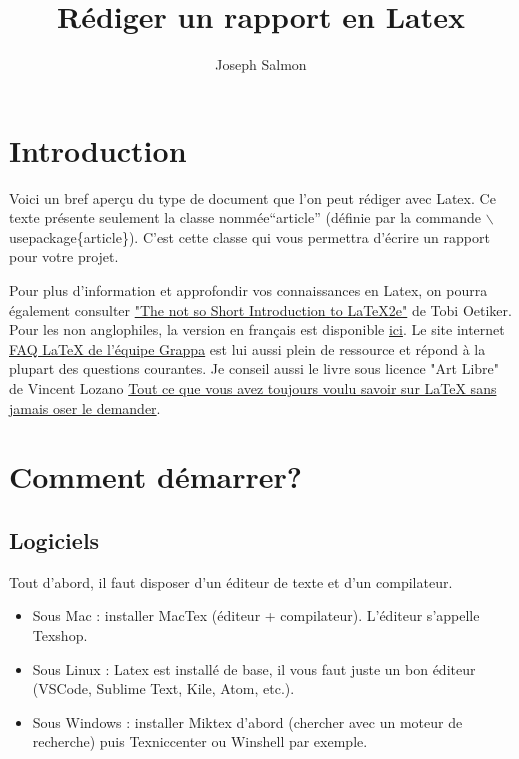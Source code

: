 \documentclass[11pt]{article}
\title{Rédiger un rapport en Latex}
\author{Joseph Salmon}
\date {}
\theoremstyle{remark}
\theoremstyle{definition}
\begin{document}
\sloppy
\maketitle
\tableofcontents
\section{Introduction}

Voici un bref aperçu du type de document que l'on peut rédiger avec  Latex.
Ce texte  présente seulement la classe nommée``article'' (définie par la commande $\backslash$usepackage\{article\}). C'est cette classe  qui vous permettra d'écrire un rapport pour votre projet.


Pour plus d'information et approfondir vos connaissances en Latex, on pourra également consulter   \href{http://tobi.oetiker.ch/lshort/}{"The not so Short Introduction to LaTeX2e"} de Tobi Oetiker. Pour les non anglophiles, la version  en français est disponible  \href{http://www.laas.fr/~matthieu/cours/latex2e/}{ici}. Le site internet \href{http://www.grappa.univ-lille3.fr/FAQ-LaTeX/}{FAQ LaTeX de l'équipe Grappa} est lui aussi plein de ressource et répond à la plupart des questions courantes. Je conseil aussi le livre sous licence "Art Libre" de Vincent Lozano \href{http://www.framabook.org/latex.html}{Tout ce que vous avez toujours voulu savoir sur LaTeX sans jamais oser le demander}.



\section{Comment démarrer?}


\subsection{Logiciels}
Tout d'abord, il faut disposer d'un éditeur de texte et d'un compilateur.

\begin{itemize}
\item Sous Mac : installer MacTex  (éditeur + compilateur).
L'éditeur s'appelle Texshop.
\item Sous Linux : Latex est installé de base, il vous faut juste un bon éditeur (VSCode, Sublime Text, Kile, Atom, etc.).
\item Sous Windows : installer Miktex d'abord (chercher avec un moteur de recherche) puis Texniccenter ou  Winshell par exemple.
\end{itemize}
\end{document}
